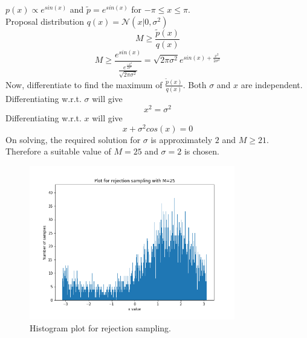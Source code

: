 \documentclass[a4paper,11pt]{article}
\begin{document}
\begin{pmisolution}
\(p(x) \propto e^{sin(x)}\) and \(\tilde{p} = e^{sin(x)}\) for \(-\pi \leq x \leq \pi\).\\
Proposal distribution \(q(x) =  \mathcal{N}(x|0,\sigma^2)\)\\
\[M \geq \frac{\tilde{p}(x)}{q(x)}\]
\[M \geq \frac{e^{sin(x)}}{\frac{e^{\frac{-x^2}{2\sigma^2}}}{\sqrt{2\pi \sigma^2}}} = \sqrt{2\pi \sigma^2}e^{sin(x) + \frac{x^2}{2\sigma^2}}\]
Now, differentiate to find the maximum of \(\frac{\tilde{p}(x)}{q(x)}\). Both \(\sigma\) and \(x\) are independent.\\
Differentiating w.r.t. \(\sigma\) will give 
\[x^2 =\sigma^2\]
Differentiating w.r.t. \(x\) will give 
\[x + \sigma^2cos(x) = 0\]
On solving, the required solution for \(\sigma\) is approximately  \(2\) and \( M \geq 21\).\\
Therefore a suitable value of \(M=25\) and \(\sigma = 2\) is chosen.
\begin{figure}[h]
\centering
\includegraphics[height=2.65in]{question_5.png}
\caption{Histogram plot for rejection sampling.} 
\label{fig:q4_02}
\end{figure}
\end{pmisolution}
\end{document}
